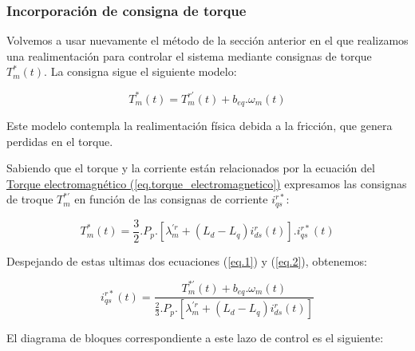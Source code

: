 \documentclass{article}
\begin{document}
\subsubsection{Incorporación de consigna de torque}

Volvemos a usar nuevamente el método de la sección anterior en el que realizamos una realimentación
para controlar el sistema mediante consignas de torque $T_m^*(t)$. La consigna sigue el siguiente modelo:

\begin{equation}\label{eq.1}
    T_m^*(t) = T_m^{r\prime}(t) + b_{eq}.\omega_m(t)
\end{equation}

Este modelo contempla la realimentación física debida a la fricción, que genera perdidas en el torque.

Sabiendo que el torque y la corriente están relacionados por la ecuación del
\hyperref[eq.torque_electromagnetico]{Torque electromagnético (\ref*{eq.torque_electromagnetico})}
expresamos las consignas de troque $T_m^{*\prime}$ en función de las consignas de corriente $i_{qs}^{r*}$:

\begin{equation}\label{eq.2}
    T_m^{*}(t) = \frac{3}{2}.P_p.[\lambda_m^{\prime r} + (L_d - L_q)i_{ds}^{r}(t)].i_{qs}^{r*}(t)
\end{equation}

Despejando de estas ultimas dos ecuaciones (\ref{eq.1}) y (\ref{eq.2}), obtenemos:

\begin{equation}
    i_{qs}^{r*}(t) = \frac{T_m^{*\prime}(t) + b_{eq}.\omega_m(t)}{\frac{2}{3}.P_p.[\lambda_m^{\prime r} + (L_d - L_q)i_{ds}^{r}(t)]}
\end{equation}


El diagrama de bloques correspondiente a este lazo de control es el siguiente:
\end{document}
